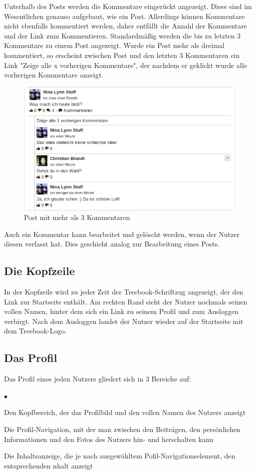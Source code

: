 \documentclass[10pt,a4paper]{book}
\makeatletter
\def\ScaleIfNeeded{%
\ifdim\Gin@nat@width>\linewidth
\linewidth
\else
\Gin@nat@width
\fi
}
\makeatother
\begin{document}
Unterhalb des Posts werden die Kommentare eingerückt angezeigt. Diese sind im Wesentlichen genauso aufgebaut, wie ein Post. Allerdings können Kommentare nicht ebenfalls kommentiert werden, daher entfällt die Anzahl der Kommentare und der Link zum Kommentieren.
Standardmäßig werden die bis zu letzten 3 Kommentare zu einem Post angezeigt. Wurde ein Post mehr als dreimal kommentiert, so erscheint zwischen Post und den letzten 3 Kommentaren ein Link "Zeige alle x vorherigen Kommentare", der nachdem er geklickt wurde alle vorherigen Kommentare anzeigt.
\begin{figure}[htbp]
\centering
\includegraphics[width=\ScaleIfNeeded]{Pictures/screen_post_and_comments.png}%
\caption{Post mit mehr als 3 Kommentaren}%
\end{figure}
Auch ein Kommentar kann bearbeitet und gelöscht werden, wenn der Nutzer diesen verfasst hat. Dies geschieht analog zur Bearbeitung eines Posts.

\subsection{Die Kopfzeile}
In der Kopfzeile wird zu jeder Zeit der Treebook-Schriftzug angezeigt, der den Link zur Startseite enthält. Am rechten Rand sieht der Nutzer nochmals seinen vollen Namen, hinter dem sich ein Link zu seinem Profil und zum Ausloggen verbirgt.
Nach dem Ausloggen landet der Nutzer wieder auf der Startseite mit dem Treebook-Logo.

\subsection{Das Profil}
Das Profil eines jeden Nutzers gliedert sich in 3 Bereiche auf:
\begin{list}{$\bullet$}{}
\item Den Kopfbereich, der das Profilbild und den vollen Namen des Nutzers anzeigt
\item Die Profil-Navigation, mit der man zwischen den Beiträgen, den persönlichen Informationen und den Fotos des Nutzers hin- und herschalten kann
\item Die Inhaltsanzeige, die je nach ausgewähltem Pofil-Navigationselement, den entsprechenden nhalt anzeigt
\end{list}
\end{document}
